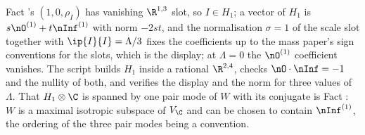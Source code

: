Fact 's $(1, 0, \rho_{I})$ has vanishing $\R^{1,3}$ slot, so $I \in H_{1}$; a vector of $H_{1}$ is $s\nO^{(1)} + t\nInf^{(1)}$ with norm $-2st$, and the normalisation $\sigma = 1$ of the scale slot together with $\ip{I}{I} = \Lambda/3$ fixes the coefficients up to the mass paper's sign conventions for the slots, which is the display; at $\Lambda = 0$ the $\nO^{(1)}$ coefficient vanishes. The script builds $H_{1}$ inside a rational $\R^{2,4}$, checks $\nO \cdot \nInf = -1$ and the nullity of both, and verifies the display and the norm for three values of $\Lambda$. That $H_{1} \otimes \C$ is spanned by one pair mode of $W$ with its conjugate is Fact : $W$ is a maximal isotropic subspace of $V_{\C}$ and can be chosen to contain $\nInf^{(1)}$, the ordering of the three pair modes being a convention.
